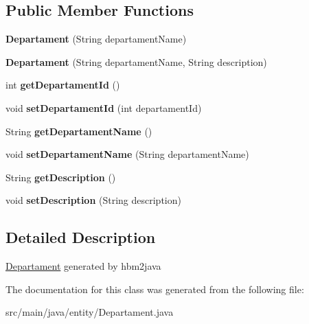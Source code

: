 \subsection*{Public Member Functions}
\begin{DoxyCompactItemize}
\item 
\mbox{\label{classentity_1_1_departament_aec9250edf629eef8fe894067d971ca31}} 
{\bfseries Departament} (String departament\+Name)
\item 
\mbox{\label{classentity_1_1_departament_acf35748b896b5c73a01f66a90730c825}} 
{\bfseries Departament} (String departament\+Name, String description)
\item 
\mbox{\label{classentity_1_1_departament_a29e8f0360c520cb00f508dd54624a492}} 
int {\bfseries get\+Departament\+Id} ()
\item 
\mbox{\label{classentity_1_1_departament_a51620d4b993b36fd01f411c65cd61424}} 
void {\bfseries set\+Departament\+Id} (int departament\+Id)
\item 
\mbox{\label{classentity_1_1_departament_adbee38a0bafc3844b7eb60cf00caabc7}} 
String {\bfseries get\+Departament\+Name} ()
\item 
\mbox{\label{classentity_1_1_departament_a55b2b5b68dd47bfb4907c1156b505fa6}} 
void {\bfseries set\+Departament\+Name} (String departament\+Name)
\item 
\mbox{\label{classentity_1_1_departament_a5332bf92f5b29d56e9559037f3c6f4a2}} 
String {\bfseries get\+Description} ()
\item 
\mbox{\label{classentity_1_1_departament_a4ffc7e3a45ab3a5878e3c1fa65695078}} 
void {\bfseries set\+Description} (String description)
\end{DoxyCompactItemize}


\subsection{Detailed Description}
\mbox{\hyperlink{classentity_1_1_departament}{Departament}} generated by hbm2java 

The documentation for this class was generated from the following file\+:\begin{DoxyCompactItemize}
\item 
src/main/java/entity/Departament.\+java\end{DoxyCompactItemize}
